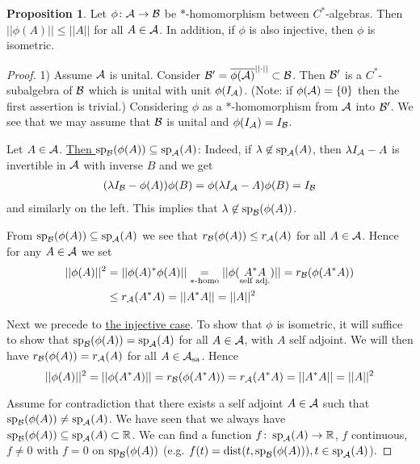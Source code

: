 \documentclass[10pt,english,a4paper]{article}
\theoremstyle{definition}
\newtheorem*{proposition}{Proposition}
\def\sa{\text{sa}}
\DeclareMathOperator{\Sp}{sp}
\begin{document}
\begin{proposition}
    Let $\phi \colon \mathcal{A}\to\mathcal{B}$ be $*$-homomorphism between $C^*$-algebras. 
Then $||\phi(A)|| \leq ||A||$ for all $A \in \mathcal{A}$. In addition, 
if $\phi$ is also injective, then $\phi$ is isometric.
\end{proposition}
\begin{proof}
    1) Assume $\mathcal{A}$ is unital. Consider $\mathcal{B}' = \overline{\phi(\mathcal{A})}^{||\cdot||} \subset \mathcal{B}$.
    Then $\mathcal{B}'$ is a $C^*$-subalgebra of $\mathcal{B}$ which is unital with unit $\phi(I_{\mathcal{A}})$.
    (Note: if $\phi(\mathcal{A})  = \{0\}$ then the first assertion is trivial.) Considering 
    $\phi$ as a $*$-homomorphism from $\mathcal{A}$ into $\mathcal{B}'$. We see that we may assume that 
$\mathcal{B}$ is unital and $\phi(I_{\mathcal{A}}) = I_{\mathcal{B}}$. 

Let $A \in \mathcal{A}$. \ul{Then $\Sp_{\Bs}(\phi(A))\subseteq \Sp_{\As}(A)$}:
Indeed, if $\la \not\in \Sp_{\As}(A)$, then $\lambda I_{\mathcal{A}} - A$ is invertible in 
$\mathcal{A}$ with inverse $B$ and we get 
\begin{align*}
    (\lambda I_{\mathcal{B}} - \phi(A) )\phi(B) = \phi(\lambda I_{\mathcal{A}} - A)\phi(B) = I_{\mathcal{B}}
\end{align*}
and similarly on the left. This implies that $\la \not \in \Sp_{\Bs}(\phi(A))$.
 
From $\Sp_{\Bs}(\phi(A))\subseteq \Sp_{\As}(A)$ we see that 
$r_{\mathcal{B}} (\phi(A)) \leq r_{\mathcal{A}}(A)$ for all $A \in \mathcal{A}$. Hence for any $A \in \mathcal{A}$
we set 
\begin{align*}
    ||\phi(A)||^2 &= ||\phi(A)^*\phi(A)|| \underset{*\text{-homo}}{=}
    ||\phi(\underset{\text{self adj.}}{A^*A})|| = r_{\mathcal{B}}(\phi(A^*A)) \\
    &\leq r_{\mathcal{A}}(A^*A) = ||A^*A|| = ||A||^2
\end{align*}

Next we precede to \ul{the injective case}. To show that $\phi$ is isometric, it will 
suffice to show that $\Sp_{\Bs}(\phi(A)) = \Sp_{\As}(A)$ for all $A \in \mathcal{A}$, with $A$ self adjoint.
We will then have $r_{\mathcal{B}}(\phi(A)) = r_{\mathcal{A}}(A)$ for all $A \in \As_{\sa}$. Hence 
\[||\phi(A)||^2 = ||\phi(A^*A)|| = r_{\mathcal{B}}(\phi(A^*A)) = r_{\mathcal{A}}(A^*A) 
= ||A^*A|| = ||A||^2 \]

Assume for contradiction that there exists a self adjoint $A \in \mathcal{A}$ such that 
$\Sp_{\Bs}(\phi(A)) \neq \Sp_{\As}(A)$. We have seen that we always have 
$\Sp_{\Bs}(\phi(A)) \subseteq \Sp_{\As}(A) \subset \R$. 
We can find a function $f \colon \Sp_{\As}(A) \to \R$, $f$ continuous, $f \neq 0$
with $f=0$ on $\Sp_{\Bs}(\phi(A))$ (e.g. $f(t) = \text{dist}(t, \Sp_{\Bs}(\phi(A))), t \in \Sp_{\As}(A)$).


\end{proof}
\end{document}

